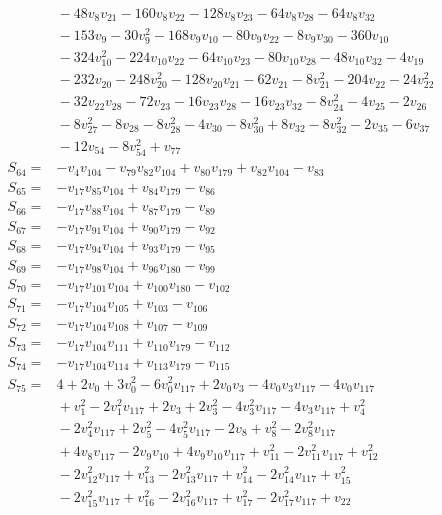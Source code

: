 \documentclass[11pt]{article}
\begin{document}
\begin{align*}
&{}-48v_{8}v_{21}-160v_{8}v_{22}-128v_{8}v_{23}-64v_{8}v_{28}-64v_{8}v_{32}\\
&{}-153v_{9}-30v_{9}^{2}-168v_{9}v_{10}-80v_{9}v_{22}-8v_{9}v_{30}-360v_{10}\\
&{}-324v_{10}^{2}-224v_{10}v_{22}-64v_{10}v_{23}-80v_{10}v_{28}-48v_{10}v_{32}-4v_{19}\\
&{}-232v_{20}-248v_{20}^{2}-128v_{20}v_{21}-62v_{21}-8v_{21}^{2}-204v_{22}-24v_{22}^{2}\\
&{}-32v_{22}v_{28}-72v_{23}-16v_{23}v_{28}-16v_{23}v_{32}-8v_{24}^{2}-4v_{25}-2v_{26}\\
&{}-8v_{27}^{2}-8v_{28}-8v_{28}^{2}-4v_{30}-8v_{30}^{2}+8v_{32}-8v_{32}^{2}-2v_{35}-6v_{37}\\
&{}-12v_{54}-8v_{54}^{2}+v_{77}\\
S_{64}={}&-v_{4}v_{104}-v_{79}v_{82}v_{104}+v_{80}v_{179}+v_{82}v_{104}-v_{83}\\
S_{65}={}&-v_{17}v_{85}v_{104}+v_{84}v_{179}-v_{86}\\
S_{66}={}&-v_{17}v_{88}v_{104}+v_{87}v_{179}-v_{89}\\
S_{67}={}&-v_{17}v_{91}v_{104}+v_{90}v_{179}-v_{92}\\
S_{68}={}&-v_{17}v_{94}v_{104}+v_{93}v_{179}-v_{95}\\
S_{69}={}&-v_{17}v_{98}v_{104}+v_{96}v_{180}-v_{99}\\
S_{70}={}&-v_{17}v_{101}v_{104}+v_{100}v_{180}-v_{102}\\
S_{71}={}&-v_{17}v_{104}v_{105}+v_{103}-v_{106}\\
S_{72}={}&-v_{17}v_{104}v_{108}+v_{107}-v_{109}\\
S_{73}={}&-v_{17}v_{104}v_{111}+v_{110}v_{179}-v_{112}\\
S_{74}={}&-v_{17}v_{104}v_{114}+v_{113}v_{179}-v_{115}\\
S_{75}={}&4+2v_{0}+3v_{0}^{2}-6v_{0}^{2}v_{117}+2v_{0}v_{3}-4v_{0}v_{3}v_{117}-4v_{0}v_{117}\\
&{}+v_{1}^{2}-2v_{1}^{2}v_{117}+2v_{3}+2v_{3}^{2}-4v_{3}^{2}v_{117}-4v_{3}v_{117}+v_{4}^{2}\\
&{}-2v_{4}^{2}v_{117}+2v_{5}^{2}-4v_{5}^{2}v_{117}-2v_{8}+v_{8}^{2}-2v_{8}^{2}v_{117}\\
&{}+4v_{8}v_{117}-2v_{9}v_{10}+4v_{9}v_{10}v_{117}+v_{11}^{2}-2v_{11}^{2}v_{117}+v_{12}^{2}\\
&{}-2v_{12}^{2}v_{117}+v_{13}^{2}-2v_{13}^{2}v_{117}+v_{14}^{2}-2v_{14}^{2}v_{117}+v_{15}^{2}\\
&{}-2v_{15}^{2}v_{117}+v_{16}^{2}-2v_{16}^{2}v_{117}+v_{17}^{2}-2v_{17}^{2}v_{117}+v_{22}\\

\end{align*}
\end{document}
